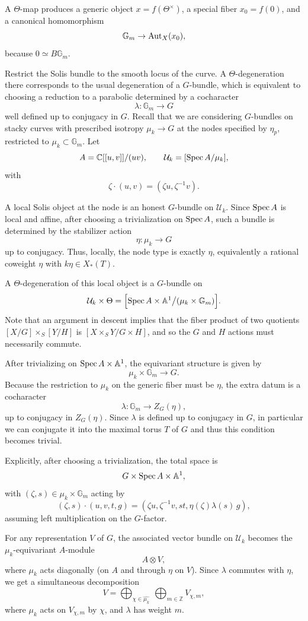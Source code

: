 \documentclass[12pt]{article}
\begin{document}
A $\Theta$-map produces a generic object $x=f(\Theta^\times)$, a special fiber $x_0=f(0)$, and a canonical homomorphism
\[
\mathbb{G}_m \to \operatorname{Aut}_X(x_0),
\]
because $0 \simeq B\mathbb{G}_m$.

Restrict the Solis bundle to the smooth locus of the curve. A $\Theta$-degeneration there corresponds to the usual degeneration of a $G$-bundle, which is equivalent to choosing a reduction to a parabolic determined by a cocharacter
\[
\lambda :\mathbb{G}_m \to G
\] well defined up to conjugacy in $G$.
Recall that we are considering $G$-bundles on stacky curves with prescribed isotropy $\mu_k \to G$ at the nodes specified by $\eta_p$, restricted to $\mu_k \subset \mathbb{G}_m$. 
Let
\[
A=\mathbb{C}[[u,v]]/(uv),\qquad \mathcal{U}_k=[\operatorname{Spec} A/\mu_k],
\]
with
\[
\zeta\cdot (u,v)=(\zeta u,\zeta^{-1}v).
\]

A local Solis object at the node is an honest \(G\)-bundle on \(\mathcal{U}_k\). Since \(\operatorname{Spec} A\) is local and affine, after choosing a trivialization on \(\operatorname{Spec} A\), such a bundle is determined by the stabilizer action
\[
\eta:\mu_k\to G
\]
up to conjugacy. Thus, locally, the node type is exactly \(\eta\), equivalently a rational coweight \(\eta\) with \(k\eta\in X_*(T)\).

A \(\Theta\)-degeneration of this local object is a \(G\)-bundle on
\[
\mathcal{U}_k\times \Theta
=
\Bigl[\operatorname{Spec} A\times \mathbb{A}^1 \big/ (\mu_k\times \mathbb{G}_m)\Bigr].
\]
Note that an argument in descent implies that the fiber product of two quotients $[X/G]\times_S [Y/H]$ is $[X\times_S Y / G\times H]$, and so the $G$ and $H$ actions must necessarily commute.

After trivializing on \(\operatorname{Spec} A\times \mathbb{A}^1\), the equivariant structure is given by
\[
\mu_k\times \mathbb{G}_m \to G.
\]
Because the restriction to \(\mu_k\) on the generic fiber must be \(\eta\), the extra datum is a cocharacter
\[
\lambda:\mathbb{G}_m\to Z_G(\eta),
\]
up to conjugacy in \(Z_G(\eta)\). Since $\lambda$ is defined up to conjugacy in $G$, in particular we can conjugate it into the maximal torus $T$ of $G$ and thus this condition becomes trivial.

Explicitly, after choosing a trivialization, the total space is
\[
G\times \operatorname{Spec} A\times \mathbb{A}^1,
\]
with \((\zeta,s)\in \mu_k\times \mathbb{G}_m\) acting by
\[
(\zeta,s)\cdot (u,v,t,g)
=
(\zeta u,\zeta^{-1}v,st,\eta(\zeta)\lambda(s)\,g),
\]
assuming left multiplication on the \(G\)-factor. 

For any representation \(V\) of \(G\), the associated vector bundle on \(\mathcal{U}_k\) becomes the \(\mu_k\)-equivariant \(A\)-module
\[
A\otimes V,
\]
where \(\mu_k\) acts diagonally (on \(A\) and through \(\eta\) on \(V\)). Since \(\lambda\) commutes with \(\eta\), we get a simultaneous decomposition
\[
V=\bigoplus_{\chi\in \widehat{\mu_k}}\ \bigoplus_{m\in \mathbb{Z}} V_{\chi,m},
\]
where \(\mu_k\) acts on \(V_{\chi,m}\) by \(\chi\), and \(\lambda\) has weight \(m\).
\end{document}
